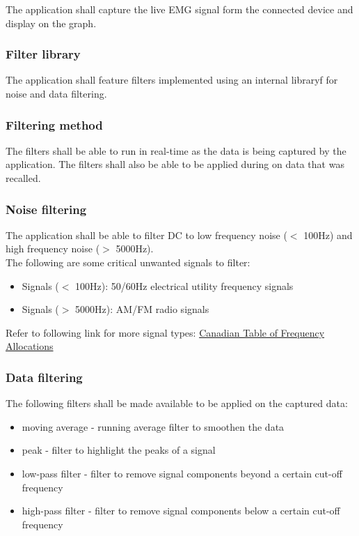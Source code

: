 \documentclass[12pt,a4paper]{article}
\begin{document}
The application shall capture the live EMG signal form the connected device and display on the graph.

\subsubsection{Filter library}

The application shall feature filters implemented using an internal libraryf for noise and data filtering.

\subsubsection{Filtering method}

The filters shall be able to run in real-time as the data is being captured by the application. 
The filters shall also be able to be applied during on data that was recalled.

\subsubsection{Noise filtering}

The application shall be able to filter DC to low frequency noise ($<$ 100Hz) and high frequency noise ($>$ 5000Hz). \\

The following are some critical unwanted signals to filter: 

\begin{itemize}
	\item Signals ($<$ 100Hz): 50/60Hz electrical utility frequency signals
	\item Signals ($>$ 5000Hz): AM/FM radio signals
\end{itemize}

Refer to following link for more signal types: \cite{ICGC} \href{https://www.ic.gc.ca/eic/site/smt-gst.nsf/eng/sf10759}{Canadian Table of Frequency Allocations}

\subsubsection{Data filtering}

The following filters shall be made available to be applied on the captured data:

\begin{itemize}
\item moving average - running average filter to smoothen the data 
\item peak - filter to highlight the peaks of a signal
\item low-pass filter - filter to remove signal components beyond a certain cut-off frequency
\item high-pass filter - filter to remove signal components below a certain cut-off frequency
\end{itemize}
\end{document}
